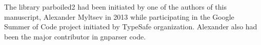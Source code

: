 \documentclass{bmcart}
\begin{document}
The library parboiled2 had been initiated by one of the authors of this
manuscript, Alexander Myltsev in 2013 while participating in the Google Summer
of Code project initiated by TypeSafe organization. Alexander also had been the
major contributor in gnparser code.



\end{document}
